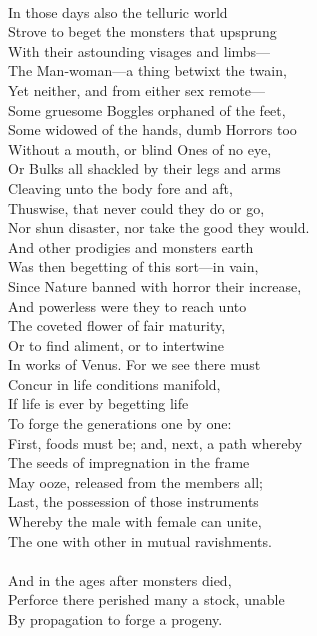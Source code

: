\\
In those days also the telluric world\\
Strove to beget the monsters that upsprung\\
With their astounding visages and limbs—\\
The Man-woman—a thing betwixt the twain,\\
Yet neither, and from either sex remote—\\
Some gruesome Boggles orphaned of the feet,\\
Some widowed of the hands, dumb Horrors too\\
Without a mouth, or blind Ones of no eye,\\
Or Bulks all shackled by their legs and arms\\
Cleaving unto the body fore and aft,\\
Thuswise, that never could they do or go,\\
Nor shun disaster, nor take the good they would.\\
And other prodigies and monsters earth\\
Was then begetting of this sort—in vain,\\
Since Nature banned with horror their increase,\\
And powerless were they to reach unto\\
The coveted flower of fair maturity,\\
Or to find aliment, or to intertwine\\
In works of Venus. For we see there must\\
Concur in life conditions manifold,\\
If life is ever by begetting life\\
To forge the generations one by one:\\
First, foods must be; and, next, a path whereby\\
The seeds of impregnation in the frame\\
May ooze, released from the members all;\\
Last, the possession of those instruments\\
Whereby the male with female can unite,\\
The one with other in mutual ravishments.\\
\\
And in the ages after monsters died,\\
Perforce there perished many a stock, unable\\
By propagation to forge a progeny.\\
